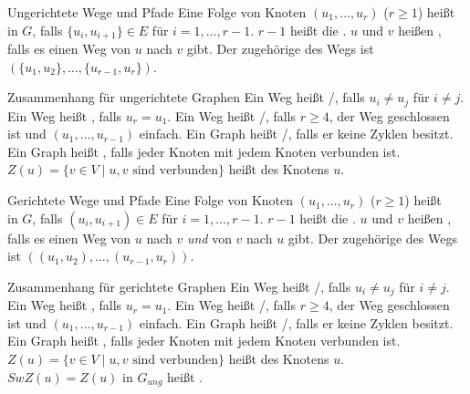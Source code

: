 \begin{Def}{Ungerichtete Wege und Pfade}
    Eine Folge von Knoten $(u_1, \ldots, u_r)$ ($r \ge 1$) heißt 
    in $G$, falls $\{u_i, u_{i+1}\} \in E$ für $i = 1, \ldots, r-1$.
    $r-1$ heißt die .
    $u$ und $v$ heißen , falls es einen Weg von $u$ nach
    $v$ gibt.
    Der zugehörige  des Wegs ist
    $(\{u_1, u_2\}, \ldots, \{u_{r-1}, u_r\})$.
\end{Def}

\begin{Def}{Zusammenhang für ungerichtete Graphen}
    Ein Weg heißt /, falls
    $u_i \not= u_j$ für $i \not= j$.
    Ein Weg heißt , falls $u_r = u_1$.
    Ein Weg heißt /, falls
    $r \ge 4$, der Weg geschlossen ist und $(u_1, \ldots, u_{r-1})$ einfach.
    Ein Graph heißt /, falls er keine
    Zyklen besitzt. \\
    Ein Graph heißt , falls jeder Knoten mit jedem
    Knoten verbunden ist. \\
    $Z(u) = \{v \in V \;|\; u, v \text{ sind verbunden}\}$ heißt
     des Knotens $u$.
\end{Def}

\begin{Def}{Gerichtete Wege und Pfade}
    Eine Folge von Knoten $(u_1, \ldots, u_r)$ ($r \ge 1$) heißt\\
     in $G$, falls $(u_i, u_{i+1}) \in E$ für
    $i = 1, \ldots, r-1$.
    $r-1$ heißt die .
    $u$ und $v$ heißen , falls es einen Weg von $u$ nach
    $v$ \emph{und} von $v$ nach $u$ gibt.
    Der zugehörige  des Wegs ist
    $((u_1, u_2), \ldots, (u_{r-1}, u_r))$.
\end{Def}

\begin{Def}{Zusammenhang für gerichtete Graphen}
    Ein Weg heißt /, falls
    $u_i \not= u_j$ für $i \not= j$.
    Ein Weg heißt , falls $u_r = u_1$.
    Ein Weg heißt /, falls
    $r \ge 4$, der Weg geschlossen ist und $(u_1, \ldots, u_{r-1})$ einfach.
    Ein Graph heißt /, falls er keine
    Zyklen besitzt. \\
    Ein Graph heißt , falls jeder Knoten mit
    jedem Knoten verbunden ist.
    $Z(u) = \{v \in V \;|\; u, v \text{ sind verbunden}\}$ heißt
     des Knotens $u$.
    $SwZ(u) = Z(u) \text{ in } G_{ung}$ heißt
    .
\end{Def}

